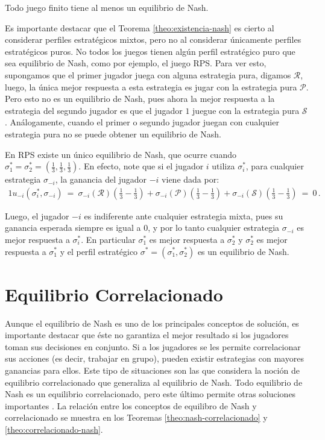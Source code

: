 \begin{theorem}
\label{theo:existencia-nash}
Todo juego finito tiene al menos un equilibrio de Nash.
\end{theorem}

Es importante destacar que el Teorema \ref{theo:existencia-nash} es cierto al considerar perfiles estratégicos mixtos, pero no al considerar únicamente perfiles estratégicos puros. No todos los juegos tienen algún perfil estratégico puro que sea equilibrio de Nash, como por ejemplo, el juego RPS. Para ver esto, supongamos que el primer jugador juega con alguna estrategia pura, digamos $\mathcal{R}$, luego, la única mejor respuesta a esta estrategia es jugar con la estrategia pura $\mathcal{P}$. Pero esto no es un equilibrio de Nash, pues ahora la mejor respuesta a la estrategia del segundo jugador es que el jugador $1$ juegue con la estrategia pura $\mathcal{S}$. Análogamente, cuando el primer o segundo jugador juegan con cualquier estrategia pura no se puede obtener un equilibrio de Nash.

En RPS existe un único equilibrio de Nash, que ocurre cuando $\sigma^*_1 = \sigma^*_2 = \left(\frac{1}{3}, \frac{1}{3}, \frac{1}{3} \right)$. En efecto, note que si el jugador $i$ utiliza $\sigma^*_i$, para cualquier estrategia $\sigma_{-i}$, la ganancia del jugador $-i$ viene dada por:
\begin{alignat}{1}
	u_{-i}(\sigma^*_i, \sigma_{-i})\ =\ \sigma_{-i}(\mathcal{R}) \left( \frac{1}{3} -  \frac{1}{3} \right) + \sigma_{-i}(\mathcal{P}) \left( \frac{1}{3} -  \frac{1}{3} \right) + \sigma_{-i}(\mathcal{S}) \left( \frac{1}{3} -  \frac{1}{3} \right)\ =\ 0 \,.
\end{alignat}

Luego, el jugador $-i$ es indiferente ante cualquier estrategia mixta, pues su ganancia esperada siempre es igual a $0$, y por lo tanto cualquier estrategia $\sigma_{-i}$ es mejor respuesta a $\sigma^*_i$. En particular $\sigma^*_1$ es mejor respuesta a $\sigma^*_2$ y $\sigma^*_2$ es mejor respuesta a $\sigma^*_1$ y el perfil estratégico $\sigma^* = (\sigma^*_1, \sigma^*_2)$ es un equilibrio de Nash.

\section{Equilibrio Correlacionado}
\label{section:equilibrio-correlacionado}

Aunque el equilibrio de Nash es uno de los principales conceptos de solución, es importante destacar que éste no garantiza el mejor resultado si los jugadores toman sus decisiones en conjunto. Si a los jugadores se les permite correlacionar sus acciones (es decir, trabajar en grupo), pueden existir estrategias con mayores ganancias para ellos. 
Este tipo de situaciones son las que considera la noción de equilibrio correlacionado que generaliza al equilibrio de Nash. Todo equilibrio de Nash es un equilibrio correlacionado, pero este último permite otras soluciones importantes \cite{bib:correlated-equilibrium}. La relación entre los conceptos de equilibro de Nash y correlacionado se muestra en los Teoremas \ref{theo:nash-correlacionado} y \ref{theo:correlacionado-nash}.

